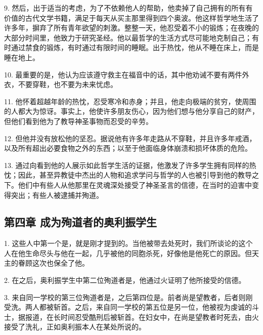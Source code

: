 9. 然后，出于适当的考虑，为了不依赖他人的帮助，他卖掉了自己拥有的所有有价值的古代文学书籍，满足于每天从买主那里得到四个奥波。他这样哲学地生活了许多年，摒弃了所有青年欲望的刺激。整整一天，他忍受着不小的锻炼；在夜晚的大部分时间里，他致力于研究圣经。他以最哲学的生活方式尽可能地克制自己；有时通过禁食的锻炼，有时通过有限时间的睡眠。出于热忱，他从不睡在床上，而是睡在地上。\par

10. 最重要的是，他认为应该遵守救主在福音中的话，其中他劝诫不要有两件外衣，不要穿鞋，也不要为未来忧虑。\par

11. 他怀着超越年龄的热忱，忍受寒冷和赤身；并且，他走向极端的贫穷，使周围的人都大为惊讶。事实上，他使许多朋友伤心，因为他们想与他分享自己的财产，但他们看到他为了教导神圣事物而忍受的辛劳。\par

12. 但他并没有放松他的坚忍。据说他有许多年走路从不穿鞋，并且许多年戒酒，以及所有超出必要食物之外的东西；以至于他面临身体崩溃和损坏体质的危险。\par

13. 通过向看到他的人展示如此哲学生活的证据，他激发了许多学生拥有同样的热忱；因此，甚至异教徒中杰出的人物和追求学问与哲学的人也被引导到他的教导之下。他们中有些人从他那里在灵魂深处接受了神圣圣言的信德，在当时的迫害中变得突出；有些人被逮捕并殉道。\par


\subsection{第四章 成为殉道者的奥利振学生}

1. 这些人中第一个是，就是刚才提到的。当他被带去处死时，我们所谈论的这个人在他生命尽头与他在一起，几乎被他的同胞杀死，好像他是他死亡的原因。但天主的眷顾这次也保全了他。\par

2. 在之后，奥利振学生中第二位殉道者是，他通过火证明了他所接受的信德。\par

3. 来自同一学校的第三位殉道者是，之后第四位是。前者尚是望教者，后者则刚受洗。两人都被斩首。之后，来自同一学校的第五位是另一位，他被视为虔诚的斗士，据报道，在长时间忍受酷刑后被斩首。在妇女中，在尚是望教者时死去，由火接受了洗礼，正如奥利振本人在某处所说的。\par

